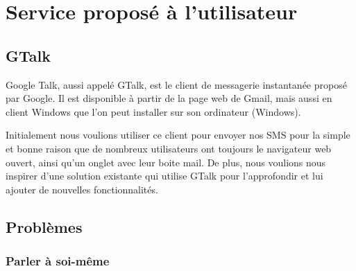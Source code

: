 
\section{Service proposé à l'utilisateur}
\label{Service proposé à l'utilisateur}


\subsection{GTalk}
\label{GTalk}

Google Talk, aussi appelé GTalk, est le client de messagerie instantanée proposé par Google.
Il est disponible à partir de la page web de Gmail, mais aussi en client Windows que l'on peut installer sur son ordinateur (Windows).

Initialement nous voulions utiliser ce client pour envoyer nos SMS pour la simple et bonne raison que de nombreux utilisateurs ont toujours le navigateur web ouvert, ainsi qu'un onglet avec leur boite mail.
De plus, nous voulions nous inspirer d'une solution existante qui utilise GTalk pour l'approfondir et lui ajouter de nouvelles fonctionnalités.
\\


\subsection{Problèmes}
\label{Problèmes}

\subsubsection{Parler à soi-même}

